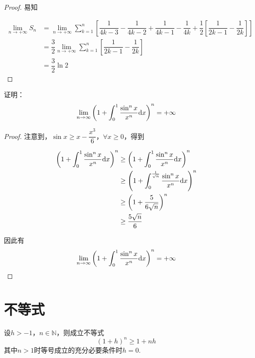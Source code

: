 \begin{proof}

    易知
    
    \begin{align*}
        \lim\limits_{n \to +\infty } S_{n} & =  \lim\limits_{n\to +\infty} \sum\limits_{k = 1}^{n} \left[   \dfrac{1}{4k-3} - \dfrac{1}{4k-2} +  \dfrac{1}{4k-1} - \dfrac{1}{4k}  + \dfrac{1}{2} \left[  \dfrac{1}{2k-1} -\dfrac{1}{2k} \right]      \right] \\
        & = \dfrac{3}{2} \lim\limits_{n \to + \infty} \sum\limits_{k = 1}^{n}  \left[  \dfrac{1}{2k-1} -\dfrac{1}{2k} \right] \\
        & = \dfrac{3}{2} \ln 2
    \end{align*}

\end{proof}

\begin{proposition}

    证明：
    $$\lim\limits_{n \to \infty}{\left( 1 + \int_{0}^{1}{\dfrac{\sin^n{x}}{x^n}}\mathrm{d} x \right)^n} = + \infty$$

\end{proposition}

\begin{proof}

    注意到，$\sin{x} \geq x - \dfrac{x^3}{6}$，$\forall x \geq 0$，得到

    \begin{align*}
        \left( 1 + \int_{0}^{1}{\dfrac{\sin^n{x}}{x^n}}\mathrm{d} x \right)^n & \geq \left( 1 + \int_{0}^{1}{\dfrac{\sin^n x}{x^n}}\mathrm{d} x \right)^n \\
        & \geq \left( 1 + \int_{0}^{\frac{1}{\sqrt{n}}}{\dfrac{\sin^n{x}}{x^n}}\mathrm{d} x \right)^n \\
        & \geq \left(1 + \dfrac{5}{6\sqrt{n}}\right)^n \\
        & \geq \dfrac{5\sqrt{n}}{6}
    \end{align*}

    因此有
    $$\lim\limits_{n \to \infty}{\left( 1 + \int_{0}^{1}{\dfrac{\sin^n{x}}{x^n}}\mathrm{d} x \right)^n} = + \infty$$

\end{proof}

\section{不等式}

\begin{theorem}[Bernoulli不等式]

    设$h>-1$，$n\in\mathbb{N}$，则成立不等式
    $$(1+h)^n\geq1+nh$$
    其中$n>1$时等号成立的充分必要条件时$h=0$.

\end{theorem}

